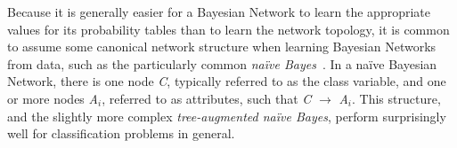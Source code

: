 \documentclass[conference]{IEEEtran}
\begin{document}

Because it is generally easier for a Bayesian Network to learn the appropriate values for its probability tables than to learn the network topology, it is common to assume some canonical network structure when learning Bayesian Networks from data, such as the particularly common \emph{na\"{i}ve Bayes}~\cite{Darwiche:10}. In a na\"{i}ve Bayesian Network, there is one node \emph{C}, typically referred to as the class variable, and one or more nodes \emph{A$_{i}$}, referred to as attributes, such that \emph{C} $\rightarrow$ \emph{A$_{i}$}. This structure, and the slightly more complex \emph{tree-augmented na\"{i}ve Bayes}, perform surprisingly well for classification problems in general.~\cite{Friedman:97}\cite{Quinlan:93}

\end{document}
